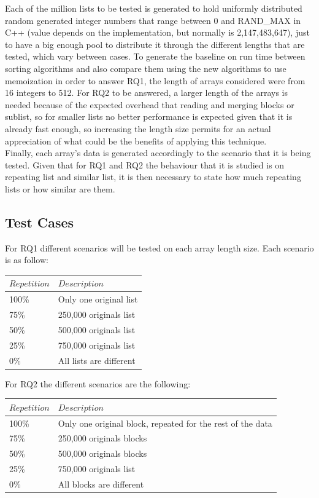 \documentclass[a4paper,12pt]{article}
\begin{document}
Each of the million lists to be tested is generated to hold uniformly distributed random generated integer numbers that range between 0 and RAND\_MAX in C++ (value depends on the implementation, but normally is 2,147,483,647), just  to have a big enough pool to distribute it through the different lengths that are tested, which vary between cases. To generate the baseline on run time between sorting algorithms and also compare them using the new algorithms to use memoization in order to answer RQ1, the length of arrays considered were from 16 integers to 512. For RQ2 to be answered, a larger length of the arrays is needed because of the expected overhead that reading and merging blocks or sublist, so for smaller lists no better performance is expected given that it is already fast enough, so increasing the length size permits for an actual appreciation of what could be the benefits of applying this technique.\\

Finally, each array's data is generated accordingly to the scenario that it is being tested. Given that for RQ1 and RQ2 the behaviour that it is studied is on repeating list and similar list, it is then necessary to state how much repeating lists or how similar are them. 

\subsection{Test Cases}

For RQ1 different scenarios will be tested on each array length size. Each scenario is as follow:
\\

\begin{tabular}{|l|l|} \toprule
	{$Repetition $} & {$Description$}  \\ \midrule
	100\% & Only one original list \\
	75\% & 250,000 originals list  \\
	50\% & 500,000 originals list \\
	25\% & 750,000 originals list \\
	0\% & All lists are different \\ \midrule
\end{tabular}

For RQ2 the different scenarios are the following:
\\

\begin{tabular}{|l|l|} \toprule
	{$Repetition $} & {$Description$}  \\ \midrule
	100\% & Only one  original block, repeated for the rest of the data \\
	75\% & 250,000 originals blocks   \\
	50\% & 500,000 originals blocks \\
	25\% & 750,000 originals list \\
	0\% & All blocks are different \\ \midrule
\end{tabular}
\end{document}
